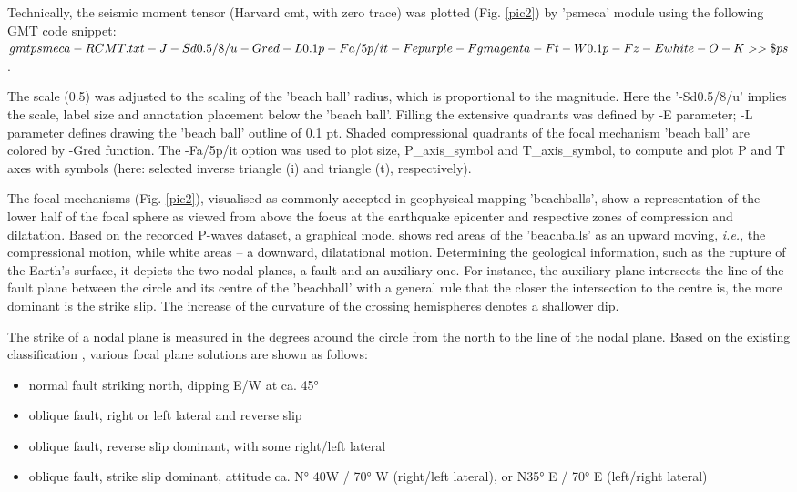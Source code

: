 \documentclass{rrparticle}
\begin{document}
Technically, the seismic moment tensor (Harvard \ac{cmt}, with zero trace) was plotted (Fig. \ref{pic2}) by 'psmeca' module using the following GMT code snippet: \\$gmt psmeca -R CMT.txt -J -Sd0.5/8/u -Gred -L0.1p -Fa/5p/it \\-Fepurple -Fgmagenta -Ft -W0.1p -Fz -Ewhite -O -K >> \$ps$.

The scale (0.5) was adjusted to the scaling of the 'beach ball' radius, which is proportional to the magnitude. Here the '-Sd0.5/8/u' implies the scale, label size and annotation placement below the 'beach ball'. Filling the extensive quadrants was defined by -E parameter; -L parameter defines drawing the 'beach ball' outline of 0.1 pt. Shaded compressional quadrants of the focal mechanism 'beach ball' are colored by -Gred function. The -Fa/5p/it option was used to plot size, P\_axis\_symbol and T\_axis\_symbol, to compute and plot P and T axes with symbols (here: selected inverse triangle (i) and triangle (t), respectively). 

The focal mechanisms (Fig. \ref{pic2}), visualised as commonly accepted in geophysical mapping 'beachballs', show a representation of the lower half of the focal sphere as viewed from above the focus at the earthquake epicenter and respective zones of compression and dilatation. Based on the recorded P-waves dataset, a graphical model shows red areas of the 'beachballs' as an upward moving, \emph{i.e.}, the compressional motion, while white areas – a downward, dilatational motion. Determining the geological information, such as the rupture of the Earth's surface, it depicts the two nodal planes, a fault and an auxiliary one. For instance, the auxiliary plane intersects the line of the fault plane between the circle and its centre of the 'beachball' with a general rule that the closer the intersection to the centre is, the more dominant is the strike slip. The increase of the curvature of the crossing hemispheres denotes a shallower dip.

The strike of a nodal plane is measured in the degrees around the circle from the north to the line of the nodal plane. Based on the existing classification \cite{Mueller}, various focal plane solutions are shown as follows: \begin{itemize}\itemsep -0.5em 
  \item normal fault striking north, dipping E/W at ca. 45°
  \item oblique fault, right or left lateral and reverse slip
  \item oblique fault, reverse slip dominant, with some right/left lateral 
  \item oblique fault, strike slip dominant, attitude ca. N° 40W / 70° W (right/left lateral), or N35° E / 70° E (left/right lateral)
 \end{itemize}
     
\end{document}

